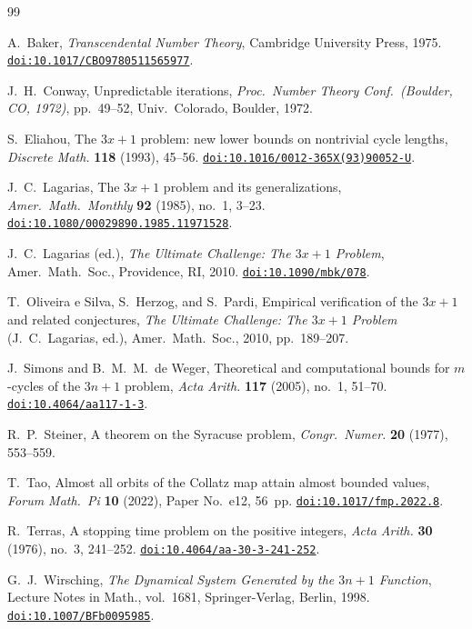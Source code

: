 \documentclass[manuscript]{aomart}
\theoremstyle{plain}
\theoremstyle{definition}
\theoremstyle{remark}
\numberwithin{equation}{section}
\begin{document}

\begin{thebibliography}{99}

A.~Baker,
\emph{Transcendental Number Theory},
Cambridge University Press, 1975.
\newblock \href{https://doi.org/10.1017/CBO9780511565977}%
  {\texttt{doi:10.1017/CBO9780511565977}}.

J.~H.~Conway,
Unpredictable iterations,
\emph{Proc.\ Number Theory Conf.\ (Boulder, CO, 1972)},
pp.~49--52, Univ.\ Colorado, Boulder, 1972.

S.~Eliahou,
The $3x+1$ problem: new lower bounds on nontrivial cycle lengths,
\emph{Discrete Math.}
\textbf{118} (1993), 45--56.
\newblock \href{https://doi.org/10.1016/0012-365X(93)90052-U}%
  {\texttt{doi:10.1016/0012-365X(93)90052-U}}.

J.~C.~Lagarias,
The $3x+1$ problem and its generalizations,
\emph{Amer.\ Math.\ Monthly}
\textbf{92} (1985), no.~1, 3--23.
\newblock \href{https://doi.org/10.1080/00029890.1985.11971528}%
  {\texttt{doi:10.1080/00029890.1985.11971528}}.

J.~C.~Lagarias (ed.),
\emph{The Ultimate Challenge: The $3x+1$ Problem},
Amer.\ Math.\ Soc., Providence, RI, 2010.
\newblock \href{https://doi.org/10.1090/mbk/078}%
  {\texttt{doi:10.1090/mbk/078}}.

T.~Oliveira e Silva, S.~Herzog, and S.~Pardi,
Empirical verification of the $3x+1$ and related conjectures,
\emph{The Ultimate Challenge: The $3x+1$ Problem} (J.~C.~Lagarias, ed.),
Amer.\ Math.\ Soc., 2010, pp.~189--207.

J.~Simons and B.~M.~M.~de Weger,
Theoretical and computational bounds for $m$-cycles of the $3n+1$
problem,
\emph{Acta Arith.}
\textbf{117} (2005), no.~1, 51--70.
\newblock \href{https://doi.org/10.4064/aa117-1-3}%
  {\texttt{doi:10.4064/aa117-1-3}}.

R.~P.~Steiner,
A theorem on the Syracuse problem,
\emph{Congr.\ Numer.}
\textbf{20} (1977), 553--559.

T.~Tao,
Almost all orbits of the Collatz map attain almost bounded values,
\emph{Forum Math.\ Pi}
\textbf{10} (2022), Paper No.~e12, 56~pp.
\newblock \href{https://doi.org/10.1017/fmp.2022.8}%
  {\texttt{doi:10.1017/fmp.2022.8}}.

R.~Terras,
A stopping time problem on the positive integers,
\emph{Acta Arith.}
\textbf{30} (1976), no.~3, 241--252.
\newblock \href{https://doi.org/10.4064/aa-30-3-241-252}%
  {\texttt{doi:10.4064/aa-30-3-241-252}}.

G.~J.~Wirsching,
\emph{The Dynamical System Generated by the $3n+1$ Function},
Lecture Notes in Math., vol.~1681,
Springer-Verlag, Berlin, 1998.
\newblock \href{https://doi.org/10.1007/BFb0095985}%
  {\texttt{doi:10.1007/BFb0095985}}.

\end{thebibliography}
\end{document}
